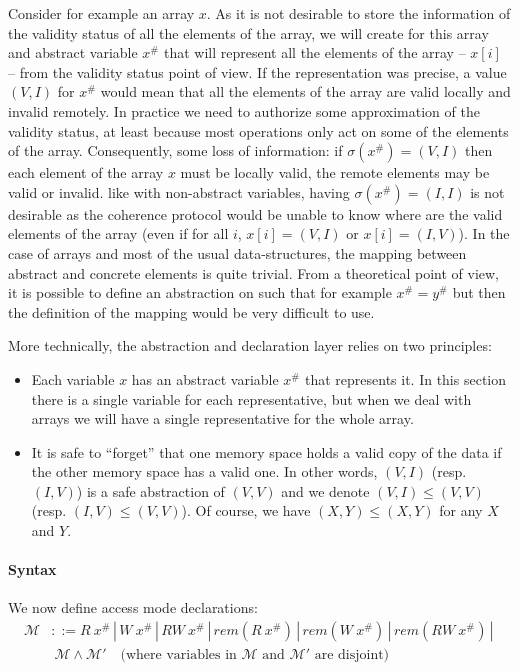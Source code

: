 \documentclass[preprint,12pt]{elsarticle}
\newcommand{\symb}[1]{\textit{#1}}
\newcommand{\rem}[1]{\symb{rem}(#1)}
\newcommand{\abs}[1]{#1^\#}
\newcommand{\AM}{\mathcal{M}}
\begin{document}
Consider for example an array $x$. As it is not desirable to store the information of the validity status of all the elements of the array, we will create for this array and abstract variable $\abs x$ that will represent all the elements of the array -- $x[i]$ -- from the validity status point of view. If the representation was precise, a value $(V,I)$ for $\abs x$ would mean that all the elements of the array are valid locally and invalid remotely. In practice we need to authorize some approximation of the validity status, at least because most operations only act on some of the elements of the array. Consequently, some loss of information: if $\sigma(\abs x)=(V,I)$ then each element of the array $x$ must be locally valid, the remote elements may be valid or invalid. like with non-abstract variables, having $\sigma(\abs x)=(I,I)$ is  not desirable as the coherence protocol would be unable to know where are the valid elements of the array (even if for all $i$, $x[i]=(V,I)$ or $x[i]=(I,V)$). In the case of arrays and most of the usual data-structures, the mapping between abstract and concrete elements is quite trivial. From a theoretical point of view,  it is possible to define an abstraction on  such that for example $\abs x=\abs y$ but then the definition of the mapping would be very difficult to use.


More technically, the abstraction and declaration layer relies on two principles:
\begin{itemize}
\item Each variable $x$ has an abstract variable $\abs x$ that represents it. In this 
section there is 
a single variable for each representative, but when we deal with arrays we will 
have a single representative for the whole array.
\item It is safe to ``forget'' that one memory space holds a valid copy of the data if 
the other memory space has a valid one. In other words, $(V,I)$ (resp. $(I,V)$) is a safe 
abstraction of $(V,V)$ and we denote $(V,I)\leq (V,V)$ (resp. $(I,V)\leq (V,V)$). Of 
course, we have $(X,Y)\leq (X,Y)$ for any $X$ and $Y$.
\end{itemize}

\paragraph{Syntax}
We now define access mode declarations:\\[-3.3ex]
\begin{align*}
\AM&::=R\ \abs x \,|\, W\ \abs x \,|\, RW\ \abs x \,|\, 
\rem{R\ \abs x} \,|\,\rem{W\ \abs x} \,|\,\rem{RW\ \abs x} \,|\, \\
&~ \AM \land \AM' \quad \text{(where variables in $\AM$ and $\AM'$ are disjoint)}
\end{align*}
\end{document}
